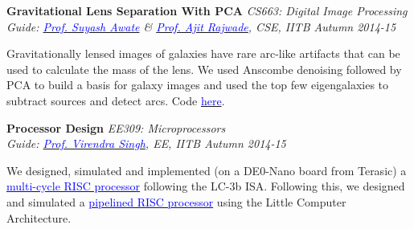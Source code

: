 \documentclass[margin,line]{res}
\newenvironment{list1}{
  \begin{list}{\ding{113}}{%
      \setlength{\itemsep}{0in}
      \setlength{\parsep}{0in} \setlength{\parskip}{0in}
      \setlength{\topsep}{0in} \setlength{\partopsep}{0in} 
      \setlength{\leftmargin}{0.17in}}}{\end{list}}
\begin{document}
\begin{resume}
\vspace*{-0.1in}

{\bf Gravitational Lens Separation With PCA} \hfill \textit{CS663: Digital Image Processing} \\
{\em Guide: \href{https://www.cse.iitb.ac.in/~suyash}{\textcolor{blue}{Prof. Suyash Awate}} \& \href{https://www.cse.iitb.ac.in/~ajitvr}{\textcolor{blue}{Prof. Ajit Rajwade}}, CSE, IITB \hfill Autumn 2014-15} \\
\vspace*{-.15in}
\begin{list1}
\item[] Gravitationally lensed images of galaxies have rare arc-like artifacts that can be used to calculate the mass of the lens. We used Anscombe denoising followed by PCA to build a basis for galaxy images and used the top few eigengalaxies to subtract sources and detect arcs. Code \href{https://github.com/alankarkotwal/pca-lens-finder}{\textcolor{blue} {here}}.
\end{list1}

\vspace*{-0.1in}

{\bf Processor Design} \hfill \textit{EE309: Microprocessors} \\
{\em Guide: \href{https://www.ee.iitb.ac.in/~viren/}{\textcolor{blue}{Prof. Virendra Singh}}, EE, IITB \hfill Autumn 2014-15} \\
\vspace*{-.15in}
\begin{list1}
\item[] We designed, simulated and implemented (on a DE0-Nano board from Terasic) a \href{https://github.com/alankarkotwal/lc-3b-processor}{\textcolor{blue} {multi-cycle RISC processor}} following the LC-3b ISA. Following this, we designed and simulated a \href{https://github.com/alankarkotwal/lca-processor}{\textcolor{blue} {pipelined RISC processor}} using the Little Computer Architecture.
\end{list1}


\end{resume}
\end{document}
